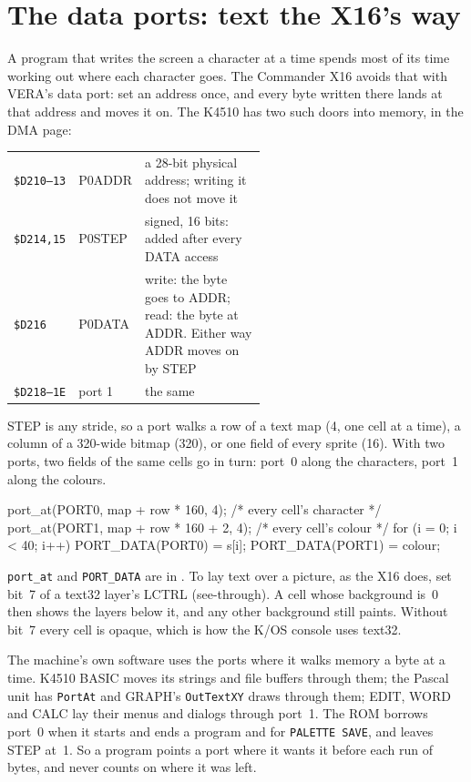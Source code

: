 \section{The data ports: text the X16's way}\label{sec:ports}
A program that writes the screen a character at a time spends most
of its time working out where each character goes. The Commander
X16 avoids that with VERA's data port: set an address once, and
every byte written there lands at that address and moves it on.
The K4510 has two such doors into memory, in the DMA page:

\begin{center}
\small
\begin{tabular}{@{}l l >{\raggedright\arraybackslash}p{0.55\linewidth}@{}}
\toprule
\texttt{\$D210--13} & P0ADDR & a 28-bit physical address; writing it does not move it\\
\texttt{\$D214,15} & P0STEP & signed, 16 bits: added after every DATA access\\
\texttt{\$D216} & P0DATA & write: the byte goes to ADDR; read: the byte at ADDR. Either way ADDR moves on by STEP\\
\texttt{\$D218--1E} & port 1 & the same\\
\bottomrule
\end{tabular}
\end{center}

STEP is any stride, so a port walks a row of a text map (4, one
cell at a time), a column of a 320-wide bitmap (320), or one field
of every sprite (16). With two ports, two fields of the same cells
go in turn: port~0 along the characters, port~1 along the colours.

\begin{type}
port_at(PORT0, map + row * 160, 4);       /* every cell's character */
port_at(PORT1, map + row * 160 + 2, 4);   /* every cell's colour */
for (i = 0; i < 40; i++) {
    PORT_DATA(PORT0) = s[i];
    PORT_DATA(PORT1) = colour;
}
\end{type}

\texttt{port\_at} and \texttt{PORT\_DATA} are in .
To lay text over a picture, as the X16 does, set bit~7 of a text32
layer's LCTRL (see-through). A cell whose background is~0 then
shows the layers below it, and any other background still paints.
Without bit~7 every cell is opaque, which is how the K/OS console
uses text32.

The machine's own software uses the ports where it walks memory a
byte at a time. K4510 BASIC moves its strings and file buffers
through them; the Pascal unit has \verb|PortAt| and GRAPH's
\verb|OutTextXY| draws through them; EDIT, WORD and CALC lay their
menus and dialogs through port~1. The ROM borrows port~0 when it
starts and ends a program and for \texttt{PALETTE SAVE}, and leaves
STEP at~1. So a program points a port where it wants it before each
run of bytes, and never counts on where it was left.

